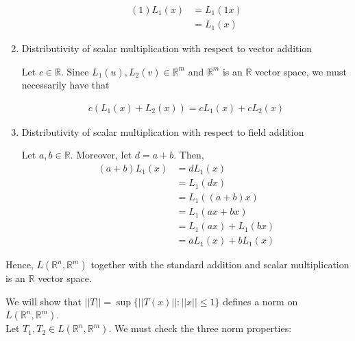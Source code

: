 \documentclass[12pt]{article}
\newenvironment{problem}[2][Problem]{\begin{trivlist}
\item[\hskip \labelsep {\bfseries #1}\hskip \labelsep {\bfseries #2.}]}{\end{trivlist}}
\begin{document}
\begin{enumerate}
\begin{align*}
(1)L_1(x) &= L_1(1x)\\
&= L_1(x)
\end{align*}

\item Distributivity of scalar multiplication with respect to vector addition

Let $c \in \mathbb{R}$. Since $L_1(u), L_2(v) \in \mathbb{R}^m$ and $\mathbb{R}^m$ is an $\mathbb{R}$ vector space, we must necessarily have that 

\begin{align*}
c(L_1(x) + L_2(x)) = cL_1(x) + cL_2(x)
\end{align*}

\item Distributivity of scalar multiplication with respect to field addition

Let $a, b \in \mathbb{R}$. Moreover, let $d = a+b$. Then,
\begin{align*}
(a+ b)L_1(x) &= dL_1(x)\\
&= L_1(dx)\\
&= L_1((a+b)x)\\
&= L_1(ax + bx)\\
&= L_1(ax) + L_1(bx)\\
&= aL_1(x) + bL_1(x)
\end{align*}
\end{enumerate}

Hence, $L(\mathbb{R}^n, \mathbb{R}^m)$ together with the standard addition and scalar multiplication is an $\mathbb{R}$ vector space.

\begin{problem}{2}
\end{problem}

We will show that $||T|| = \sup \{||T(x)||: ||x|| \leq 1\}$ defines a norm on $L(\mathbb{R}^n, \mathbb{R}^m)$.\\

Let $T_1, T_2 \in L(\mathbb{R}^n, \mathbb{R}^m)$. We must check the three norm properties:
\end{document}
